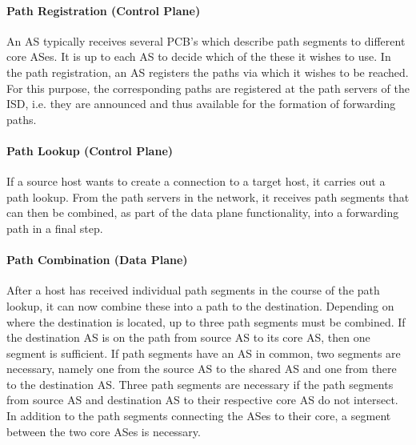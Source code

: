\paragraph{Path Registration (Control Plane)}

An AS typically receives several PCB's which describe path segments to different core ASes. It is up to each AS to decide which of the these it wishes to use. In the path registration, an AS registers the paths via which it wishes to be reached. For this purpose, the corresponding paths are registered at the path servers of the ISD, i.e. they are announced and thus available for the formation of forwarding paths. 

\paragraph{Path Lookup (Control Plane)}

If a source host wants to create a connection to a target host, it carries out a path lookup. From the path servers in the network, it receives path segments that can then be combined, as part of the data plane functionality,  into a forwarding path in a final step. 

\paragraph{Path Combination (Data Plane)}

After a host has received individual path segments in the course of the path lookup, it can now combine these into a path to the destination. Depending on where the destination is located, up to three path segments must be combined. If the destination AS is on the path from source AS to its core AS, then one segment is sufficient. If path segments have an AS in common, two segments are necessary, namely one from the source AS to the shared AS and one from there to the destination AS. Three path segments are necessary if the path segments from source AS and destination AS to their respective core AS do not intersect. In addition to the path segments connecting the ASes to their core, a segment between the two core ASes is necessary.


